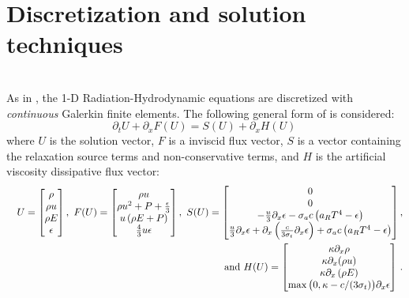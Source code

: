 \documentclass[times,doublespace]{fldauth}%
\begin{document}
\section{Discretization and solution techniques}
\label{sec:discr}
%
\cite{I would remove this section and replace it with a few lines in the numerical results section saying that we use the same discretization as in the first paper.} \\
As in \cite{our_jcp_radhy_paper}, the 1-D Radiation-Hydrodynamic equations  are discretized with \emph{continuous} Galerkin finite elements. 
The following general form of  is considered:
\begin{equation}
\label{eq:form}
\partial_t U + \partial_x F \left( U \right) = S(U) + \partial_x H \left(U\right) \,
\end{equation}
where $U$ is the solution vector, $F$ is a inviscid flux vector, $S$ is a vector containing the relaxation source terms and non-conservative terms, and $H$ is the artificial viscosity dissipative flux vector:
\begin{eqnarray*}
&&U = 
\begin{bmatrix}
\rho \\
\rho u \\
\rho E \\
\epsilon
\end{bmatrix}
,\
F(U) = 
\begin{bmatrix}
\rho u \\
\rho u^2 + P + \frac{\epsilon}{3} \\
u \left( \rho E + P \right) \\
\frac{4}{3} u \epsilon
\end{bmatrix}
,\ 
S(U) = 
\begin{bmatrix}
0 \\
0 \\
-\frac{u}{3} \partial_x \epsilon - \sigma_a c \left( \ar T^4 - \epsilon \right) \\
\frac{u}{3} \partial_x \epsilon + \partial_x \left( \frac{c}{3 \sigma_t} \partial_x \epsilon \right) + \sigma_a c \left( \ar T^4 - \epsilon \right)
\end{bmatrix}
,
\\
&&\text{ and } 
H(U) = 
\begin{bmatrix}
\kappa \partial_x \rho \\
\kappa \partial_x (\rho u) \\
\kappa \partial_x \left( \rho E \right)\\
\max \big( 0, \kappa- c/(3 \sigma_t) \big) \partial_x \epsilon 
\end{bmatrix} \,.
\end{eqnarray*}
\end{document}
